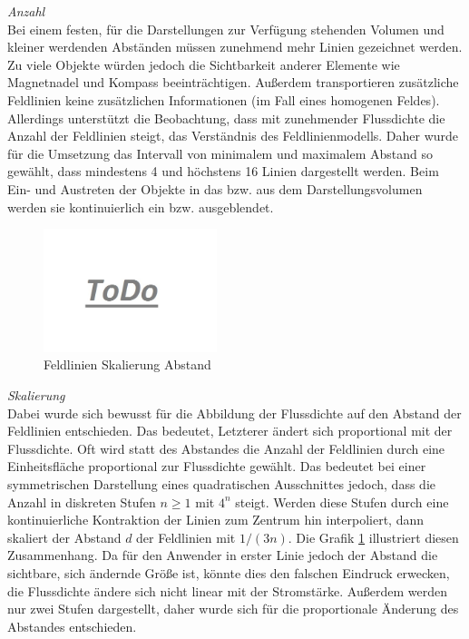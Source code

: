 \textit{Anzahl}\\
Bei einem festen, für die Darstellungen zur Verfügung stehenden Volumen und kleiner werdenden Abständen müssen zunehmend mehr Linien gezeichnet werden. Zu viele Objekte würden jedoch die Sichtbarkeit anderer Elemente wie Magnetnadel und Kompass beeinträchtigen. Außerdem transportieren zusätzliche Feldlinien keine zusätzlichen Informationen (im Fall eines homogenen Feldes). Allerdings unterstützt die Beobachtung, dass mit zunehmender Flussdichte die Anzahl der Feldlinien steigt, das Verständnis des Feldlinienmodells. Daher wurde für die Umsetzung das Intervall von minimalem und maximalem Abstand so gewählt, dass mindestens 4 und höchstens 16 Linien dargestellt werden. Beim Ein- und Austreten der Objekte in das bzw. aus dem Darstellungsvolumen werden sie kontinuierlich ein bzw. ausgeblendet.\\

\begin{figure}[H]
	\centering
	\includegraphics[width=0.45\textwidth]{images/todo.jpg}
	\caption{Feldlinien Skalierung Abstand}
	\label{img:mfield-lines-scaling}
\end{figure}

\textit{Skalierung}\\
Dabei wurde sich bewusst für die Abbildung der Flussdichte auf den Abstand der Feldlinien entschieden. Das bedeutet, Letzterer ändert sich proportional mit der Flussdichte. Oft wird statt des Abstandes die Anzahl der Feldlinien durch eine Einheitsfläche proportional zur Flussdichte gewählt. Das bedeutet bei einer symmetrischen Darstellung eines quadratischen Ausschnittes jedoch, dass die Anzahl in diskreten Stufen $n \geq 1$ mit $4^{n}$ steigt. Werden diese Stufen durch eine kontinuierliche Kontraktion der Linien zum Zentrum hin interpoliert, dann skaliert der Abstand $d$ der Feldlinien mit $1/(3n)$. Die Grafik \ref{img:mfield-lines-scaling} illustriert diesen Zusammenhang. Da für den Anwender in erster Linie jedoch der Abstand die sichtbare, sich ändernde Größe ist, könnte dies den falschen Eindruck erwecken, die Flussdichte ändere sich nicht linear mit der Stromstärke. Außerdem werden nur zwei Stufen dargestellt, daher wurde sich für die proportionale Änderung des Abstandes entschieden.\\

